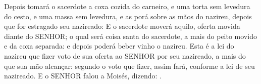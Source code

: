 {{  Depois tomará o sacerdote a coxa cozida do carneiro, e uma torta sem levedura do cesto, e uma massa sem levedura, e as porá sobre as mãos do nazireu, depois que for estragado seu nazireado:
  E o sacerdote moverá aquilo, oferta movida diante do SENHOR; o qual será coisa santa do sacerdote, a mais do peito movido e da coxa separada: e depois poderá beber vinho o nazireu.
  Esta é a lei do nazireu que fizer voto de sua oferta ao SENHOR por seu nazireado, a mais do que sua mão alcançar: segundo o voto que fizer, assim fará, conforme a lei de seu nazireado}.
  E o SENHOR falou a Moisés, dizendo:
  .
\par }

